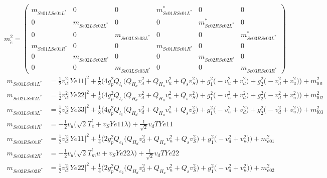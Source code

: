 \begin{itemize}
\begin{equation} 
m^2_{\tilde{e}} = \left( 
\begin{array}{cccccc}
m_{Se01LSe01L^*} &0 &0 &m^*_{Se01RSe01L^*} &0 &0\\ 
0 &m_{Se02LSe02L^*} &0 &0 &m^*_{Se02RSe02L^*} &0\\ 
0 &0 &m_{Se03LSe03L^*} &0 &0 &m^*_{Se03RSe03L^*}\\ 
m_{Se01LSe01R^*} &0 &0 &m_{Se01RSe01R^*} &0 &0\\ 
0 &m_{Se02LSe02R^*} &0 &0 &m_{Se02RSe02R^*} &0\\ 
0 &0 &m_{Se03LSe03R^*} &0 &0 &m_{Se03RSe03R^*}\end{array} 
\right) 
 \end{equation} 
\begin{align} 
m_{Se01LSe01L^*} &= \frac{1}{2} v_{d}^{2} |Ye11|^2  + \frac{1}{8} \Big(4 g_{p}^{2} Q_{l_1} \Big(Q_{H_d} v_{d}^{2}  + Q_{H_u} v_{u}^{2}  + Q_s v_{S}^{2} \Big) + g_{1}^{2} \Big(- v_{u}^{2}  + v_{d}^{2}\Big) + g_{2}^{2} \Big(- v_{d}^{2}  + v_{u}^{2}\Big)\Big) + m^2_{l01}\\ 
m_{Se02LSe02L^*} &= \frac{1}{2} v_{d}^{2} |Ye22|^2  + \frac{1}{8} \Big(4 g_{p}^{2} Q_{l_2} \Big(Q_{H_d} v_{d}^{2}  + Q_{H_u} v_{u}^{2}  + Q_s v_{S}^{2} \Big) + g_{1}^{2} \Big(- v_{u}^{2}  + v_{d}^{2}\Big) + g_{2}^{2} \Big(- v_{d}^{2}  + v_{u}^{2}\Big)\Big) + m^2_{l02}\\ 
m_{Se03LSe03L^*} &= \frac{1}{2} v_{d}^{2} |Ye33|^2  + \frac{1}{8} \Big(4 g_{p}^{2} Q_{l_3} \Big(Q_{H_d} v_{d}^{2}  + Q_{H_u} v_{u}^{2}  + Q_s v_{S}^{2} \Big) + g_{1}^{2} \Big(- v_{u}^{2}  + v_{d}^{2}\Big) + g_{2}^{2} \Big(- v_{d}^{2}  + v_{u}^{2}\Big)\Big) + m^2_{l03}\\ 
m_{Se01LSe01R^*} &= -\frac{1}{2} v_u \Big(\sqrt{2} T^{\prime}_e  + v_S Ye11 \lambda \Big) + \frac{1}{\sqrt{2}} v_d TYe11 \\ 
m_{Se01RSe01R^*} &= \frac{1}{2} v_{d}^{2} |Ye11|^2  + \frac{1}{4} \Big(2 g_{p}^{2} Q_{e_{1}} \Big(Q_{H_d} v_{d}^{2}  + Q_{H_u} v_{u}^{2}  + Q_s v_{S}^{2} \Big) + g_{1}^{2} \Big(- v_{d}^{2}  + v_{u}^{2}\Big)\Big) + m^2_{e01}\\ 
m_{Se02LSe02R^*} &= -\frac{1}{2} v_u \Big(\sqrt{2} T^{\prime}_mu  + v_S Ye22 \lambda \Big) + \frac{1}{\sqrt{2}} v_d TYe22 \\ 
m_{Se02RSe02R^*} &= \frac{1}{2} v_{d}^{2} |Ye22|^2  + \frac{1}{4} \Big(2 g_{p}^{2} Q_{e_{2}} \Big(Q_{H_d} v_{d}^{2}  + Q_{H_u} v_{u}^{2}  + Q_s v_{S}^{2} \Big) + g_{1}^{2} \Big(- v_{d}^{2}  + v_{u}^{2}\Big)\Big) + m^2_{e02}\\ 

\end{align}
\end{itemize}
